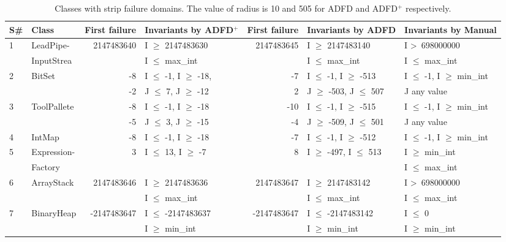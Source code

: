 \clearpage
\newpage
{\tiny
\begin{longtable}{|l|l|r|l|r|l|l|}
\caption{Classes with strip failure domains. The value of radius is 10 and 505 for ADFD and ADFD$^+$ respectively.}\\
\hline
S\#  & Class						& First failure	& Invariants by ADFD$^+$       & First failure 	& Invariants by ADFD     			& Invariants by Manual			\\
  \hline
  \endhead
1	& LeadPipe- 			 		&2147483640	& I $\ge$ 2147483630		&~2147483645	& I $\ge$ 2147483140			& I \textgreater~698000000		\\ 
	& InputStrea                            &				& I $\le$ max\_int			&				& I $\le$ max\_int				& I $\le$ max\_int				\\ \hline
2	& BitSet				  		& -8 			& I $\le$ -1, I $\ge$ -18,		&-7 			& I $\le$ -1, I $\ge$ -513			& I $\le$ -1, I $\ge$ min\_int		\\ 
	&                                             &-2 			& J $\le$ 7, J $\ge$ -12  		&~2 			& J $\ge$ -503, J $\le$ 507		& J any value						\\\hline
3	& ToolPallete			  		&-8 			& I $\le$ -1, I $\ge$ -18		&-10 			& I $\le$ -1, I $\ge$ -515			& I $\le$ -1, I $\ge$ min\_int		\\ 
	&                                             &-5 			& J $\le$ 3, J $\ge$ -15		&-4 			& J $\ge$ -509, J $\le$ 501		& J any value			   			\\\hline
4	& IntMap			  		&-8 			& I $\le$ -1, I $\ge$ -18		&-7 			& I $\le$ -1, I $\ge$ -512			& I $\le$ -1, I $\ge$ min\_int		\\\hline
5	& Expression-		  		&3 				& I $\le$ 13, I $\ge$ -7		&~8 			& I $\ge$ -497, I $\le$ 513		& I $\ge$ min\_int 				\\
	& Factory                                 &  				&	 						&				&								& I $\le$ max\_int				\\\hline
6	& ArrayStack					&2147483646	& I $\ge$ 2147483636		&~2147483647	& I $\ge$ 2147483142			& I \textgreater~698000000 		\\ 
	&                                             &				& I $\le$ max\_int		 	&				& I $\le$ max\_int				& I $\le$ max\_int 				\\\hline
7	& BinaryHeap				&-2147483647	& I $\le$ -2147483637		&-2147483647	& I $\le$ -2147483142			& I $\le$ 0						\\	
	&                                             &				& I $\ge$ min\_int			&				& I $\ge$ min\_int				& I $\ge$ min\_int				\\\hline

\end{longtable}}
